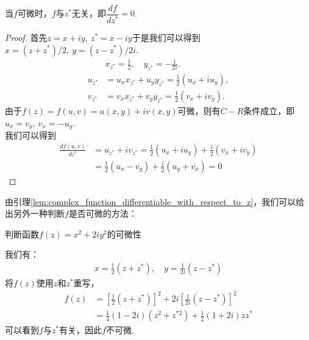         \begin{lemma}
            \label{lem:complex_function_differentiable_with_respect_to_z}
            当$f$可微时，$f$与$z^*$无关，即$\dfrac{df}{dz^*} = 0$.
        \end{lemma}
        \begin{proof}
            首先$z=x+iy,\ z^*=x-iy$于是我们可以得到$x=(z+z^*)/2,\ y=(z-z^*)/2i$.
            \begin{align*}
                &x_{z^*}=\frac{1}{2},\quad y_{z^*}=-\frac{1}{2i}.\\
                u_{z^*}&=u_x x_{z^*} + u_y y_{z^*}=\frac{1}{2}(u_x+iu_y),\\
                v_{z^*}&=v_x x_{z^*} + v_y y_{z^*}=\frac{1}{2}(v_x+iv_y).
            \end{align*}
            由于$f(z)=f(u,v)=u(x,y)+iv(x,y)$可微，则有$C-R$条件成立，即$u_x=v_y,\ v_x=-u_y$.\\
            我们可以得到
            \begin{align*}
                \frac{df(u,v)}{dz^*}&=u_{z^*}+iv_{z^*}=\frac{1}{2}(u_x+iu_y)+\frac{i}{2}(v_x+iv_y)\\
                &=\frac{1}{2}(u_x-v_y)+\frac{i}{2}(u_y+v_x)=0
            \end{align*}

        \end{proof}
        由引理\ref{lem:complex_function_differentiable_with_respect_to_z}，我们可以给出另外一种判断$f$是否可微的方法：
        \begin{example}
            判断函数$f(z) = x^2 +2iy^2$的可微性
        \end{example}
        \begin{solution}
            我们有：
            \begin{align*}
                x = \frac{1}{2}(z + z^*), \quad y = \frac{1}{2i}(z - z^*)
            \end{align*}
            将$f(z)$使用$z$和$z^*$重写，
            \begin{align*}
                f(z) &= [\frac{1}{2}(z + z^*)]^2 + 2i[\frac{1}{2i}(z - z^*)]^2\\
                &= \frac{1}{4}(1 - 2i)(z^2 + z^{*2}) + \frac{1}{2}(1 + 2i)zz^*
            \end{align*}
            可以看到$f$与$z^*$有关，因此$f$不可微.
        \end{solution}

